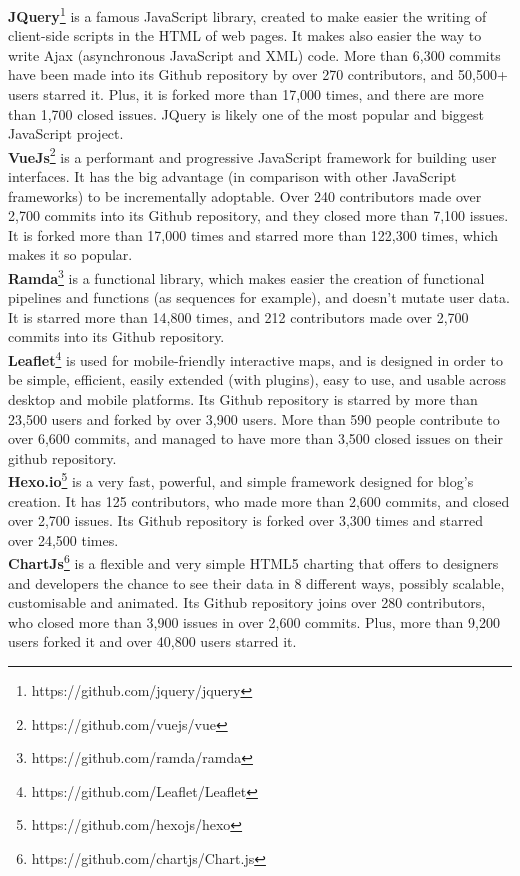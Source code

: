 \documentclass[smallcondensed]{svjour3}
\begin{document}
\textbf{JQuery}\footnote{https://github.com/jquery/jquery} is a famous JavaScript library, created to make easier the writing of client-side scripts in the HTML of web pages. It makes also easier the way to write Ajax (asynchronous JavaScript and XML) code. More than 6,300 commits have been made into its Github repository by over 270 contributors, and 50,500+ users starred it. Plus, it is forked more than 17,000 times, and there are more than 1,700 closed issues. JQuery is likely one of the most popular and biggest JavaScript project.\\
\textbf{VueJs}\footnote{https://github.com/vuejs/vue} is a performant and progressive JavaScript framework for building user interfaces. It has the big advantage (in comparison with other JavaScript frameworks) to be incrementally adoptable. Over 240 contributors made over 2,700 commits into its Github repository, and they closed more than 7,100 issues. It is forked more than 17,000 times and starred more than 122,300 times, which makes it so popular.\\
\textbf{Ramda}\footnote{https://github.com/ramda/ramda} is a functional library, which makes easier the creation of functional pipelines and functions (as sequences for example), and doesn't mutate user data. It is starred more than 14,800 times, and 212 contributors made over 2,700 commits into its Github repository.\\
\textbf{Leaflet}\footnote{https://github.com/Leaflet/Leaflet} is used for mobile-friendly interactive maps, and is designed in order to be simple, efficient, easily extended (with plugins), easy to use, and usable across desktop and mobile platforms. Its Github repository is starred by more than 23,500 users and forked by over 3,900 users. More than 590 people contribute to over 6,600 commits, and managed to have more than 3,500 closed issues on their github repository.\\
\textbf{Hexo.io}\footnote{https://github.com/hexojs/hexo} is a very fast, powerful, and simple framework designed for blog's creation. It has 125 contributors, who made more than 2,600 commits, and closed over 2,700 issues. Its Github repository is forked over 3,300 times and starred over 24,500 times.\\
\textbf{ChartJs}\footnote{https://github.com/chartjs/Chart.js} is a flexible and very simple HTML5 charting that offers to designers and developers the chance to see their data in 8 different ways, possibly scalable, customisable and animated. Its Github repository joins over 280 contributors, who closed more than 3,900 issues in over 2,600 commits. Plus, more than 9,200 users forked it and over 40,800 users starred it.\\
\end{document}
